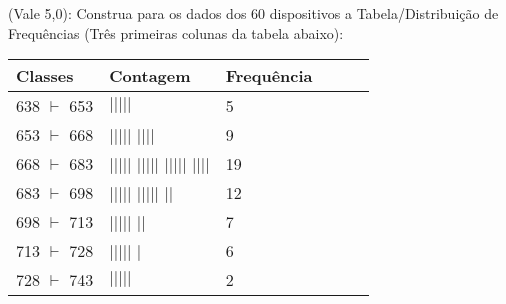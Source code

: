\documentclass{exam}
\begin{document}
\begin{questions}

\question (Vale 5,0): Construa para os dados dos 60 dispositivos a
 Tabela/Distribuição de Frequências (Três primeiras colunas da tabela abaixo): 
        \begin{solution}
              \begin{center}
                \begin{tabular}{|p{2cm}|p{2.5cm}|p{2cm}|p{1cm}|p{1cm}|p{2.5cm}|}
                \hline
                Classes & Contagem & Frequência \\ [1ex] 
                \hline
                638 $\vdash$ 653 & $|||||$ & 5 \\ 
                \hline
                653 $\vdash$ 668 & $|||||$ $||||$ & 9  \\ 
                \hline
                668 $\vdash$ 683 & $|||||$ $|||||$ $|||||$ $||||$ & 19 \\ 
                \hline
                683 $\vdash$ 698 & $|||||$ $|||||$ $||$ & 12 \\
                \hline
                698 $\vdash$ 713 & $|||||$ $||$ & 7 \\
                \hline
                713 $\vdash$ 728 & $|||||$ $|$ & 6 \\
                \hline
                728 $\vdash$ 743 & $|||||$ & 2 \\
                \hline

            \end{tabular}  
            \end{center}
        \end{solution} 

\vspace{5mm}


\end{questions}
\end{document}
